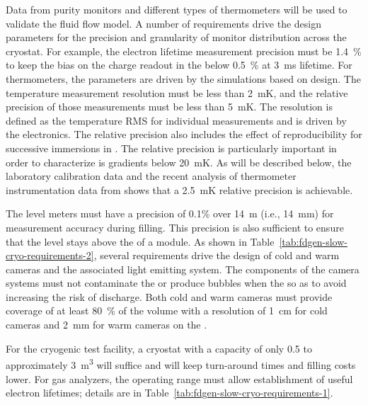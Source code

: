 Data from purity monitors and different types of thermometers will be used to validate the \lar fluid flow model. 
A number of requirements drive the design parameters for the precision and granularity of monitor distribution across the cryostat. 
For example, the electron lifetime measurement precision must be \SI{1.4}{\%} to keep the bias on the charge readout in the  below \SI{0.5}{\%} at \SI{3}{ms} lifetime. For thermometers, the %
parameters are driven by the  simulations based on  design.
The temperature measurement resolution must be less than \SI{2}{mK}, and the relative precision of those measurements must be less than \SI{5}{mK}. The resolution is defined as the temperature RMS for individual measurements and is driven by the electronics. The relative precision also includes the effect of reproducibility for successive immersions in . 
The relative precision is particularly important in order to characterize is %
gradients below \SI{20}{mK}. %
As will be described below, the laboratory calibration data and the recent analysis of thermometer instrumentation data from  shows that a \SI{2.5}{mK} relative precision is achievable. 

The level meters must have a precision of 0.1\% over \SI{14}{m} (i.e., \SI{14}{mm}) for measurement accuracy during filling. This precision is also sufficient to ensure that the  level stays above the  of a  module. As shown in Table~\ref{tab:fdgen-slow-cryo-requirements-2}, several requirements drive the design of cold and warm cameras and the associated light emitting system. The components of the camera systems must not contaminate the \lar or produce bubbles when the  so as  to avoid  increasing the risk of  discharge. Both cold and warm cameras must provide coverage of at least \SI{80}{\%} of the  volume 
with a resolution of \SI{1}{cm} for cold cameras and \SI{2}{mm} for warm cameras on the .

For the cryogenic test facility, a cryostat with a capacity of only \num{0.5} to approximately \SI{3}{m^3} %
will suffice and will keep turn-around times and filling costs %
lower. %
For gas analyzers, the operating range must allow establishment of useful electron lifetimes;
details  are in Table~\ref{tab:fdgen-slow-cryo-requirements-1}.

